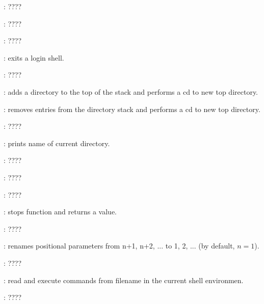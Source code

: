 \begin{compactenum}
\item [\symbolbash] : \dotfill ????

\item [\symbolbash] : \dotfill ????

\item [\symbolbash] : \dotfill ????

\item [\symbolbash] : exits a login shell.

\item [\symbolbash] : \dotfill ????

\item [\symbolbash] : adds a directory to the top of the stack and performs a cd to new top directory.
\item [\symbolbash] : removes entries from the directory stack and performs a cd to new top directory.

\item [\symbolbash] : \dotfill ????

\item [\symbolbash] : prints name of current directory.

\item [\symbolbash] : \dotfill ????

\item [\symbolbash] : \dotfill ????

\item [\symbolbash] : \dotfill ????

\item [\symbolbash] : stops function and returns a value.

\item [\symbolbash] : \dotfill ????

\item [\symbolbash] : renames positional parameters from n+1, n+2, ... to 1, 2, ... (by default, $n = 1$).

\item [\symbolbash] : \dotfill ????

\item [\symbolbash] : read and execute commands from filename in the current shell environmen.

\item [\symbolbash] : \dotfill ????



\end{compactenum}

